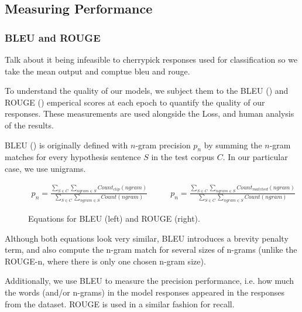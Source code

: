 \documentclass[12pt,twoside]{report}
\begin{document}
\subsection{Measuring Performance}


\subsubsection{BLEU and ROUGE}

Talk about it being infeasible to cherrypick responses used for classification so we take the mean output and comptue bleu and rouge.

To understand the quality of our models, we subject them to the BLEU (\cite{papineni_bleu:_2001}) and ROUGE (\cite{lin_rouge:_2004}) emperical scores at each epoch to quantify the quality of our responses. These measurements are used alongside the Loss, and human analysis of the results.

BLEU (\cite{papineni_bleu:_2001}) is originally defined with $n$-gram precision $p_n$ by summing the $n$-gram matches for every hypothesis sentence $S$ in the test corpus $C$. In our particular case, we use unigrams.

\begin{figure}[!ht]
	\begin{equation}
		\begin{split}
			p_n = \frac
			{\sum_{S\in C} \sum_{ngram\in S} Count_{clip}(ngram)}
			{\sum_{S\in C} \sum_{ngram\in S} Count(ngram)}
		\end{split}
		\quad\quad
		\begin{split}
			p_n = \frac
			{\sum_{S\in C} \sum_{ngram\in S} Count_{matched}(ngram)}
			{\sum_{S\in C} \sum_{ngram\in S} Count(ngram)}
		\end{split}
	\end{equation}
	\caption{Equations for BLEU (left) and ROUGE (right).}
	\end{figure}


Although both equations look very similar, BLEU introduces a brevity penalty term, and also compute the n-gram match for several sizes of n-grams (unlike the ROUGE-n, where there is only one chosen n-gram size). 

Additionally, we use BLEU to measure the precision performance, i.e. how much the words (and/or n-grams) in the model responses appeared in the responses from the dataset. ROUGE is used in a similar fashion for recall.
\end{document}
